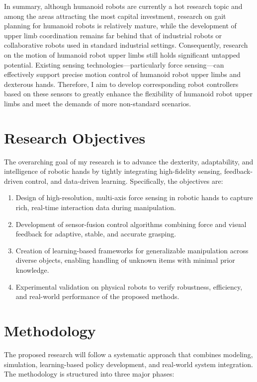 \documentclass[11pt,a4paper]{article}
\begin{document}
In summary, although humanoid robots are currently a hot research topic and among the areas attracting the most capital investment, research on gait planning for humanoid robots is relatively mature, while the development of upper limb coordination remains far behind that of industrial robots or collaborative robots used in standard industrial settings. Consequently, research on the motion of humanoid robot upper limbs still holds significant untapped potential. Existing sensing technologies—particularly force sensing—can effectively support precise motion control of humanoid robot upper limbs and dexterous hands. Therefore, I aim to develop corresponding robot controllers based on these sensors to greatly enhance the flexibility of humanoid robot upper limbs and meet the demands of more non-standard scenarios.

\section{Research Objectives}
The overarching goal of my research is to advance the dexterity, adaptability, and intelligence of robotic hands by tightly integrating high-fidelity sensing, feedback-driven control, and data-driven learning. Specifically, the objectives are:

\begin{enumerate}
\item Design of high-resolution, multi-axis force sensing in robotic hands to capture rich, real-time interaction data during manipulation.
\item Development of sensor-fusion control algorithms combining force and visual feedback for adaptive, stable, and accurate grasping.
\item Creation of learning-based frameworks for generalizable manipulation across diverse objects, enabling handling of unknown items with minimal prior knowledge.
\item Experimental validation on physical robots to verify robustness, efficiency, and real-world performance of the proposed methods.
\end{enumerate}


\section{Methodology}
The proposed research will follow a systematic approach that combines modeling, simulation, learning-based policy development, and real-world system integration. The methodology is structured into three major phases:
\end{document}
